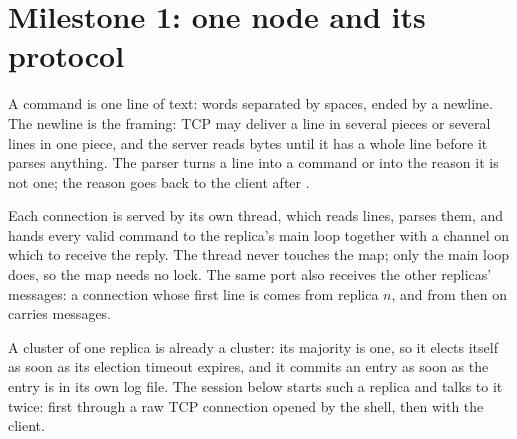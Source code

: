 \section{Milestone 1: one node and its protocol}\label{sec:b3:project-replicated-store:protocol}

A command is one line of text: words separated by spaces, ended by a newline. The newline is the framing: TCP may deliver a line in several pieces or several lines in one piece, and the server reads bytes until it has a whole line before it parses anything. The parser turns a line into a command or into the reason it is not one; the reason goes back to the client after .

\label{lst:b3:project-replicated-store:parse}

Each connection is served by its own thread, which reads lines, parses them, and hands every valid command to the replica's main loop together with a channel on which to receive the reply. The thread never touches the map; only the main loop does, so the map needs no lock. The same port also receives the other replicas' messages: a connection whose first line is  comes from replica $n$, and from then on carries  messages.

\label{lst:b3:project-replicated-store:serve}

A cluster of one replica is already a  cluster: its majority is one, so it elects itself as soon as its election timeout expires, and it commits an entry as soon as the entry is in its own log file. The session below starts such a replica and talks to it twice: first through a raw TCP connection opened by the shell, then with the  client.

\label{out:b3:project-replicated-store:m1}

